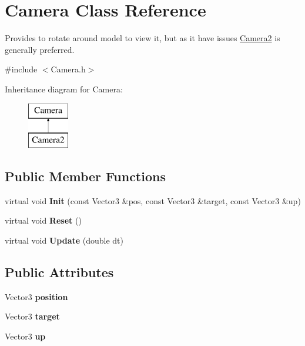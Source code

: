 \hypertarget{class_camera}{\section{Camera Class Reference}
\label{class_camera}
}


Provides to rotate around model to view it, but as it have issues \hyperlink{class_camera2}{Camera2} is generally preferred.  




{\ttfamily \#include $<$Camera.\+h$>$}

Inheritance diagram for Camera\+:\begin{figure}[H]
\begin{center}
\leavevmode
\includegraphics[height=2.000000cm]{class_camera}
\end{center}
\end{figure}
\subsection*{Public Member Functions}
\begin{DoxyCompactItemize}
\item 
\hypertarget{class_camera_a609775f7ec4cd936ad7add808cd7354c}{virtual void {\bfseries Init} (const Vector3 \&pos, const Vector3 \&target, const Vector3 \&up)}\label{class_camera_a609775f7ec4cd936ad7add808cd7354c}

\item 
\hypertarget{class_camera_aa46f58b32270a571ab56dde4caca46db}{virtual void {\bfseries Reset} ()}\label{class_camera_aa46f58b32270a571ab56dde4caca46db}

\item 
\hypertarget{class_camera_acc1741feb6d9da849ea4b6c12e0711e6}{virtual void {\bfseries Update} (double dt)}\label{class_camera_acc1741feb6d9da849ea4b6c12e0711e6}

\end{DoxyCompactItemize}
\subsection*{Public Attributes}
\begin{DoxyCompactItemize}
\item 
\hypertarget{class_camera_a3b229874a00253021a1b6c61657fa5ab}{Vector3 {\bfseries position}}\label{class_camera_a3b229874a00253021a1b6c61657fa5ab}

\item 
\hypertarget{class_camera_a7b1215b2f9c2a71cd41e4225c7df31e8}{Vector3 {\bfseries target}}\label{class_camera_a7b1215b2f9c2a71cd41e4225c7df31e8}

\item 
\hypertarget{class_camera_ab76ce866ca2acd6ab54447f474077245}{Vector3 {\bfseries up}}\label{class_camera_ab76ce866ca2acd6ab54447f474077245}

\end{DoxyCompactItemize}



